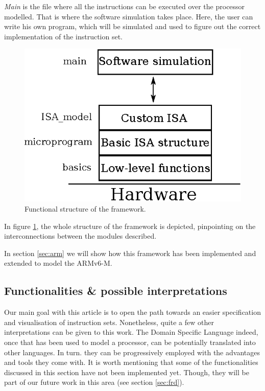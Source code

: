 \documentclass[conference]{IEEEtran}
\begin{document}
\textit{Main} is the file where all the instructions can be executed over the
processor modelled. That is where the software simulation takes place.
Here, the user can write his own program, which will be simulated 
and used to figure out the correct implementation of the instruction set.

\begin{figure}[ht!]
\begin{center}
	\includegraphics[scale=1]{IMG/structure.eps}
	\caption{Functional structure of the framework.}
	\label{fig:structure}
\end{center}
\end{figure}

In figure \ref{fig:structure}, the whole structure of the framework is depicted, pinpointing 
on the interconnections between the modules described. 

In section \ref{sec:arm} we will show how this framework has been implemented and extended
to model the ARMv6-M.

\subsection{Functionalities \& possible interpretations}
\label{sec:func}
Our main goal with this article is to open the path towards an easier specification and
visualisation of instruction sets. Nonetheless, quite a few other interpretations can be
given to this work. The Domain Specific Language indeed, once that has been used to model
a processor, can be potentially translated into other languages. In turn. they
can be progressively employed with the advantages and tools they come with. It is worth
mentioning that some of the functionalities discussed in this section have not been
implemented yet. Though, they will be part of our future work in this area (see section
\ref{sec:frd}).
\end{document}
